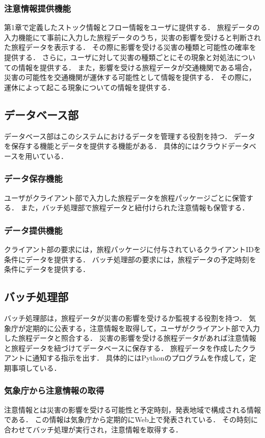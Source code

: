 \subsubsection{注意情報提供機能}
第1章で定義したストック情報とフロー情報をユーザに提供する．
旅程データの入力機能にて事前に入力した旅程データのうち，災害の影響を受けると判断された旅程データを表示する．
その際に影響を受ける災害の種類と可能性の確率を提供する．
さらに，ユーザに対して災害の種類ごとにその現象と対処法についての情報を提供する．
また，影響を受ける旅程データが交通機関である場合，災害の可能性を交通機関が運休する可能性として情報を提供する．
その際に，運休によって起こる現象についての情報を提供する．

\subsection{データベース部}
データベース部はこのシステムにおけるデータを管理する役割を持つ．
データを保存する機能とデータを提供する機能がある．
具体的にはクラウドデータベースを用いている．

\subsubsection{データ保存機能}
ユーザがクライアント部で入力した旅程データを旅程パッケージごとに保管する．
また，バッチ処理部で旅程データと紐付けられた注意情報も保管する．

\subsubsection{データ提供機能}
クライアント部の要求には，旅程パッケージに付与されているクライアントIDを条件にデータを提供する．
バッチ処理部の要求には，旅程データの予定時刻を条件にデータを提供する．

\subsection{バッチ処理部}
バッチ処理部は，旅程データが災害の影響を受けるか監視する役割を持つ．
気象庁が定期的に公表する，注意情報を取得して，ユーザがクライアント部で入力した旅程データと照合する．
災害の影響を受ける旅程データがあれば注意情報と旅程データを紐づけてデータベースに保存する．
旅程データを作成したクラアントに通知する指示を出す．
具体的にはPythonのプログラムを作成して，定期事項している．

\subsubsection{気象庁から注意情報の取得}
注意情報とは災害の影響を受ける可能性と予定時刻，発表地域で構成される情報である．
この情報は気象庁から定期的にWeb上で発表されている．
その時刻に合わせてバッチ処理が実行され，注意情報を取得する．

